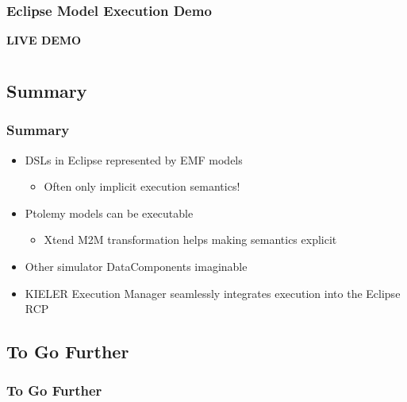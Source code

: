 \documentclass{beamer}
\newcommand{\RED}[1]{\textcolor[rgb]{0.80,0.00,0.00}{#1}}
\begin{document}
\begin{frame}
  \frametitle{Eclipse Model Execution Demo}
  \begin{center} 
      \textbf{\Large {LIVE DEMO}}
  \end{center}
  \end{frame}

\section*{}

\subsection<presentation>[Summary]{Summary}
\begin{frame}
  \frametitle{Summary}
        \begin{itemize}
	           \item DSLs in Eclipse represented by EMF models
								\begin{itemize}
									 \pause
				           \item Often only implicit execution semantics!
								\end{itemize}
						 \pause
	           \item Ptolemy models can be executable
								\begin{itemize}
				           \pause
	    			       \item Xtend M2M transformation helps making semantics explicit
								\end{itemize}
						 \pause
						 \item Other simulator DataComponents imaginable
						 \pause
						 \item \RED{KIELER Execution Manager} seamlessly integrates execution into the Eclipse RCP
        \end{itemize}
\end{frame}

\subsection<presentation>[To Go Further]{To Go Further}
\begin{frame}
  \frametitle<presentation>[To Go Further]{To Go Further}
\normalsize
  
\end{frame}
\end{document}
